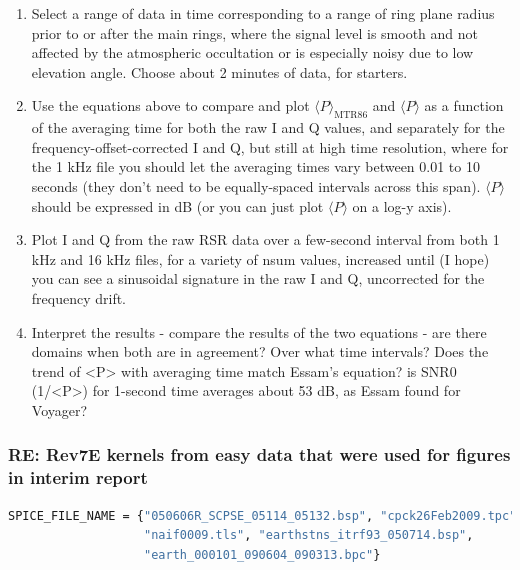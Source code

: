 \documentclass[crop=false,class=article,oneside]{standalone}
\begin{document}
\begin{enumerate}
    \item Select a range of data in time corresponding to a range of ring plane radius prior to or after the main rings, where the signal level is smooth and not affected by the atmospheric occultation or is especially noisy due to low elevation angle. Choose about 2 minutes of data, for starters.
    \item Use the equations above to compare and plot $\langle P\rangle_{\textrm{MTR86}}$ and $\langle P \rangle$ as a function of the averaging time for both the raw I and Q values, and separately for the frequency-offset-corrected I and Q, but still at high time resolution, where for the 1 kHz file you should let the averaging times vary between 0.01 to 10 seconds (they don't need to be equally-spaced intervals across this span). $\langle P \rangle$ should be expressed in dB (or you can just plot $\langle P \rangle$ on a log-y axis).
    \item Plot I and Q from the raw RSR data over a few-second interval from both 1 kHz and 16 kHz files, for a variety of nsum values, increased until (I hope) you can see a sinusoidal signature in the raw I and Q, uncorrected for the frequency drift.
    \item Interpret the results - compare the results of the two equations - are there domains when both are in agreement? Over what time intervals? Does the trend of <P> with averaging time match Essam's equation? is SNR0 (1/<P>) for 1-second time averages about 53 dB, as Essam found for Voyager?
\end{enumerate}
\subsubsection{\footnotesize RE: Rev7E kernels from easy data that were used for figures in interim report}
\begin{lstlisting}[language=bash,basicstyle=\footnotesize]
SPICE_FILE_NAME = {"050606R_SCPSE_05114_05132.bsp", "cpck26Feb2009.tpc",
                   "naif0009.tls", "earthstns_itrf93_050714.bsp",
                   "earth_000101_090604_090313.bpc"}
\end{lstlisting}
\end{document}
